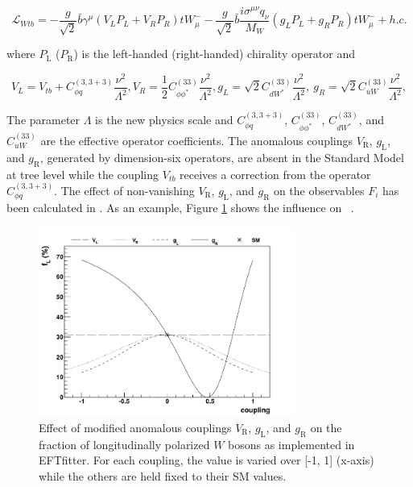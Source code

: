 \begin{equation}
\mathscr{L}_{Wtb}= - \frac{g}{\sqrt{2}}\bar{b}\gamma^{\mu}(V_{L}P_{L}+ V_{R}P_{R}) t W_{\mu}^{-} - \frac{g}{\sqrt{2}}\bar{b}\frac{i\sigma^{\mu \nu}q_{\nu}}{M_{W}}(g_{L}P_{L}+ g_{R}P_{R}) t W_{\mu}^{-} + h.c.
\label{eq:lag}
\end{equation}

where $P_{\text{L}}$ ($P_{\text{R}}$) is the left-handed (right-handed) chirality operator and 

\begin{equation}
V_{L}= V_{tb}+C_{\phi q}^{(3,3+3)}\frac{\nu^{2}}{\Lambda^{2}},  V_{R}= \frac{1}2 C_{\phi \phi^{*}}^{(33)}\frac{\nu^{2}}{\Lambda^{2}},  g_{L}= \sqrt{2}C_{dW^{*}}^{(33)}\frac{\nu^{2}}{\Lambda^{2}},  ~g_{R}= \sqrt{2}C_{uW}^{(33)}\frac{\nu^{2}}{\Lambda^{2}},
\end{equation}

The parameter $\Lambda$ is the new physics scale and $C_{\phi q}^{(3,3+3)}$, $C_{\phi\phi^*}^{(33)}$, $C_{dW^{*}}^{(33)}$, and $C_{uW}^{(33)}$ are the effective operator coefficients. The anomalous couplings $V_{\text{R}}$, $g_{\text{L}}$, and $g_{\text{R}}$, generated by dimension-six operators, are absent in the Standard Model at tree level while the coupling $V_{tb}$ receives a correction from the operator $C_{\phi q}^{(3,3+3)}$. The effect of non-vanishing $V_{\text{R}}$, $g_{\text{L}}$, and $g_{\text{R}}$ on the observables $F_{i}$ has been calculated in \cite{anom1,anom2}. As an example, Figure \ref{fig:anom_fl} shows the influence on \fl~\cite{eftfitter}.

\begin{figure}[!ht]
\begin{center}

		\includegraphics[height=62mm]{chapters/whel/figures/anomalousWtb/FL.png}
	\caption{Effect of modified anomalous couplings $V_{\text{R}}$, $g_{\text{L}}$, and $g_{\text{R}}$ on the fraction of longitudinally polarized $W$ bosons as implemented in EFTfitter. For each coupling, the value is varied over [-1, 1] (x-axis) while the others are held fixed to their SM values.}
	\label{fig:anom_fl}
\end{center}
\end{figure}

